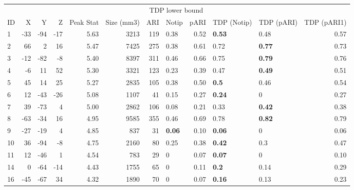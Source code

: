 
\begin{tabular}{lrrrrrrlrllr}
\toprule
\multicolumn{6}{c}{ } & \multicolumn{3}{c}{TDP lower bound} \\
\cmidrule(l{3pt}r{3pt}){7-9}
ID & X & Y & Z & Peak Stat & Size (mm3) & ARI & Notip & pARI & TDP (Notip) & TDP (pARI) & TDP (pARI1)\\
\midrule
1 & -33 & -94 & -17 & 5.63 & 3213 & 119 & 0.38 & 0.52 & \textbf{0.53} & 0.48 & 0.57\\
2 & 66 & 2 & 16 & 5.47 & 7425 & 275 & 0.38 & 0.61 & 0.72 & \textbf{0.77} & 0.73\\
3 & -12 & -82 & -8 & 5.40 & 8397 & 311 & 0.46 & 0.66 & 0.75 & \textbf{0.79} & 0.76\\
4 & -6 & 11 & 52 & 5.30 & 3321 & 123 & 0.23 & 0.39 & 0.47 & \textbf{0.49} & 0.51\\
5 & 45 & 14 & 25 & 5.27 & 2835 & 105 & 0.38 & 0.50 & \textbf{0.5} & 0.46 & 0.54\\
6 & 12 & -43 & -26 & 5.08 & 1107 & 41 & 0.15 & 0.27 & \textbf{0.24} & 0 & 0.27\\
7 & 39 & -73 & 4 & 5.00 & 2862 & 106 & 0.08 & 0.21 & 0.33 & \textbf{0.42} & 0.38\\
8 & -63 & -34 & 16 & 4.95 & 9585 & 355 & 0.46 & 0.69 & 0.78 & \textbf{0.82} & 0.79\\
9 & -27 & -19 & 4 & 4.85 & 837 & 31 & \textbf{0.06} & 0.10 & \textbf{0.06} & 0 & 0.06\\
10 & 36 & -94 & -8 & 4.75 & 2160 & 80 & 0.25 & 0.38 & \textbf{0.42} & 0.3 & 0.47\\
11 & 12 & -46 & 1 & 4.54 & 783 & 29 & 0 & 0.07 & \textbf{0.07} & 0 & 0.10\\
14 & 0 & -64 & -14 & 4.43 & 1755 & 65 & 0 & 0.11 & \textbf{0.2} & 0.14 & 0.29\\
16 & -45 & -67 & 34 & 4.32 & 1890 & 70 & 0 & 0.07 & \textbf{0.16} & 0.13 & 0.23\\
\bottomrule
\end{tabular}
